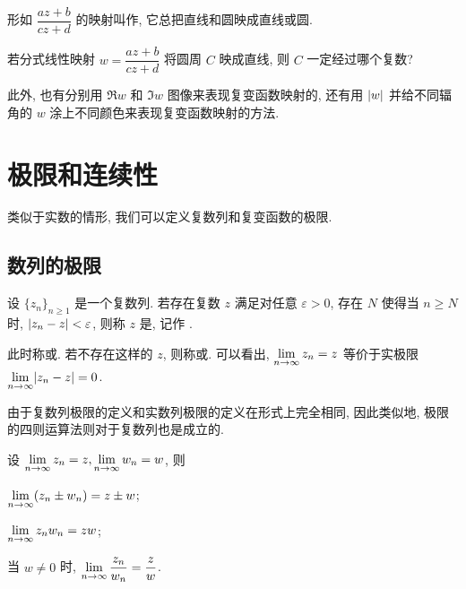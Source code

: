 形如 $\dfrac{az+b}{cz+d}$ 的映射叫作, 它总把直线和圆映成直线或圆.

\begin{exercise}
  若分式线性映射 $w=\dfrac{az+b}{cz+d}$ 将圆周 $C$ 映成直线, 则 $C$ 一定经过哪个复数?
\end{exercise}

此外, 也有分别用 $\Re w$ 和 $\Im w$ 图像来表现复变函数映射的, 还有用 $\lvert w\rvert$ 并给不同辐角的 $w$ 涂上不同颜色来表现复变函数映射的方法.



\section{极限和连续性}

类似于实数的情形, 我们可以定义复数列和复变函数的极限.

\subsection{数列的极限}

\begin{definition}
  设 $\{z_n\}_{n\ge 1}$ 是一个复数列.
  若存在复数 $z$ 满足对任意 $\varepsilon>0$, 存在 $N$ 使得当 $n\ge N$ 时, $\lvert z_n-z\rvert<\varepsilon$, 则称 $z$ 是, 记作 .
\end{definition}
此时称或.
若不存在这样的 $z$, 则称或.
可以看出, $\lim\limits_{n\rightarrow\infty}z_n=z$ 等价于实极限 $\lim\limits_{n\rightarrow\infty}\lvert z_n-z\rvert=0$.

由于复数列极限的定义和实数列极限的定义在形式上完全相同, 因此类似地, 极限的四则运算法则对于复数列也是成立的.

\begin{theorem}
  设 $\lim\limits_{n\rightarrow\infty}z_n=z,\lim\limits_{n\rightarrow\infty}w_n=w$, 则
  \begin{enuma}
    \item $\lim\limits_{n\rightarrow\infty}(z_n\pm w_n)=z\pm w$;
    \item $\lim\limits_{n\rightarrow\infty} z_nw_n=zw$;
    \item 当 $w\neq 0$ 时, $\lim\limits_{n\rightarrow\infty}\dfrac{z_n}{w_n}=\dfrac zw$.
  \end{enuma}
\end{theorem}

